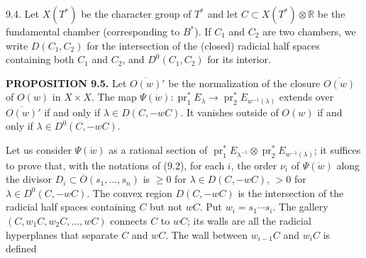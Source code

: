 \documentclass[9pt,twoside]{extarticle}
\begin{document}
{9.4. Let \(X(T^*)\) be the character group of \(T^*\) and let \(C\subset X(T^*)\otimes\mathbb R\) be the fundamental chamber (corresponding to \(B^*\)). If \(C_1\) and \(C_2\) are two chambers, we write \(D(C_1,C_2)\) for the intersection of the (closed) radicial half spaces containing both \(C_1\) and \(C_2\), and \(D^0(C_1,C_2)\) for its interior.\par

\noindent\textbf{PROPOSITION 9.5.} Let \(\overline{O(w)}'\) be the normalization of the closure \(\overline{O(w)}\) of \(O(w)\) in \(X\times X\). The map \(\Psi(\dot w):\operatorname{pr}_1^*E_\lambda\to\operatorname{pr}_2^*E_{w^{-1}(\lambda)}\) extends over \(\overline{O(w)}'\) if and only if \(\lambda\in D(C,-wC)\). It vanishes outside of \(O(w)\) if and only if \(\lambda\in D^0(C,-wC)\).\par

Let us consider \(\Psi(\dot w)\) as a rational section of \(\operatorname{pr}_1^*E_{\lambda^{-1}}\otimes\operatorname{pr}_2^*E_{w^{-1}(\lambda)}\); it suffices to prove that, with the notations of (9.2), for each \(i\), the order \(\nu_i\) of \(\Psi(\dot w)\) along the divisor \(D_i\subset\overline O(s_1,\ldots,s_n)\) is \(\ge0\) for \(\lambda\in D(C,-wC)\), \(>0\) for \(\lambda\in D^0(C,-wC)\). The convex region \(D(C,-wC)\) is the intersection of the radicial half spaces containing \(C\) but not \(wC\). Put \(w_i=s_1\cdots s_i\). The gallery \((C,w_1C,w_2C,\ldots,wC)\) connects \(C\) to \(wC\); its walls are all the radicial hyperplanes that separate \(C\) and \(wC\). The wall between \(w_{i-1}C\) and \(w_iC\) is defined\par
}
\end{document}
